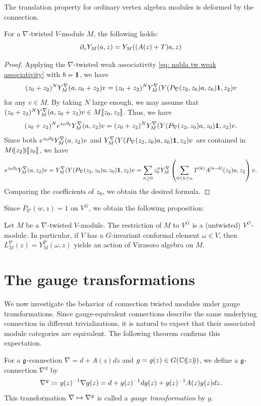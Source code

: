 \documentclass[final,reqno]{amsart}
\begin{document}
The translation property for ordinary vertex algebra modules is deformed by the connection.
\begin{cor}
    For a $\nabla$-twisted $V$-module $M$, the following holds:
    \[
        \partial_z Y_M(a,z)=Y_M((A(z)+T)a,z)
    \]
\end{cor}



\begin{proof}
    Applying the $\nabla$-twisted weak associativity \cref{eq: nabla tw weak associativity} with $b=\mathbf{1}$, we have
    \[
        (z_0+z_2)^NY^\nabla_M(a,z_0+z_2)v=(z_0+z_2)^NY^\nabla_M(Y(P_\nabla(z_2,z_0)a,z_0)\mathbf{1},z_2)v
    \]
    for any $v\in M$. By taking $N$ large enough, we may assume that $(z_0+z_2)^NY^\nabla_M(a,z_0+z_2)v\in M\llbracket z_0,z_2 \rrbracket$. Thus, we have
    \[
        (z_0+z_2)^Ne^{z_0\partial_2}Y^\nabla_M(a,z_2)v=(z_0+z_2)^NY^\nabla_M(Y(P_\nabla(z_2,z_0)a,z_0)\mathbf{1},z_2)v.
    \]
    Since both $e^{z_0\partial_2}Y^\nabla_M(a,z_2)v$ and $Y^\nabla_M(Y(P_\nabla(z_2,z_0)a,z_0)\mathbf{1},z_2)v$ are contained in $M(\!( z_2 )\!)\llbracket z_0 \rrbracket$, we have
    \[
        e^{z_0\partial_2}Y^\nabla_M(a,z_2)v=Y^\nabla_M(Y(P_\nabla(z_2,z_0)a,z_0)\mathbf{1},z_2)v=\sum_{n\geq 0}z_0^nY^\nabla_M\left(\sum_{0\leq k\leq n}T^{(k)}A^{[n-k]}(z_2)a,z_2\right)v.
    \]
    Comparing the coefficients of $z_0$, we obtain the desired formula.
\end{proof}

Since $P_\nabla(w,z)=1$ on $V^{G}$, we obtain the following proposition:  
\begin{prp}\label{prp:rest on G-invariant}
    Let $M$ be a $\nabla$-twisted $V$-module. The restriction of $M$ to $V^{G}$ is a (untwisted) $V^G$-module. In particular, if $V$ has a $G$-invariant conformal element $\omega\in V$, then $L^\nabla_M(z)=Y^\nabla_M(\omega,z)$ yields an action of Virasoro algebra on $M$. 
\end{prp}


\section{The gauge transformations}\label{s:gauge transformation}
We now investigate the behavior of connection twisted modules under gauge transformations. Since gauge-equivalent connections describe the same underlying connection in different trivializations, it is natural to expect that their associated module categories are equivalent. The following theorem confirms this expectation.

For a $\mathfrak{g}$-connection $\nabla=d+A(z)dz$ and $g=g(z)\in G(\mathbb{C}(\!( z )\!))$, we define a $\mathfrak{g}$-connection $\nabla^g$ by
\[
    \nabla^g\coloneqq g(z)^{-1}\nabla g(z)=d+g(z)^{-1}dg(z)+g(z)^{-1}A(z)g(z)dz.
\]
This transformation $\nabla\mapsto\nabla^g$ is called a \emph{gauge transformation} by $g$.
\end{document}
